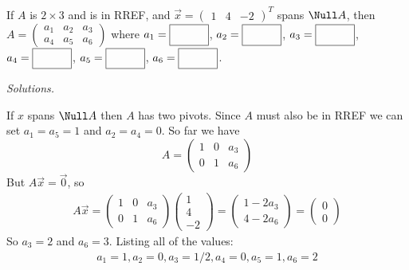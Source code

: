 \ifnum {}
    If $A$ is $2 \times 3$ and is in RREF, and $\vec x = \begin{pmatrix} 1&4&-2\end{pmatrix}^T$ spans $\Null A$, then $A=\begin{pmatrix} a_1 & a_2 & a_3 \\ a_4 & a_5 & a_6 \end{pmatrix} $ where 
    $a_1 = \framebox{\strut\hspace{1.0cm}}$, 
    $a_2 = \framebox{\strut\hspace{1.0cm}}$, 
    $a_3 = \framebox{\strut\hspace{1.0cm}}$, 
    $a_4 = \framebox{\strut\hspace{1.0cm}}$,
    $a_5 = \framebox{\strut\hspace{1.0cm}}$,
    $a_6 = \framebox{\strut\hspace{1.0cm}}$.

    \ifnum {} {\color{DarkBlue} \textit{Solutions.} 

    If $x$ spans $\Null A$ then $A$ has two pivots. Since $A$ must also be in RREF we can set $a_1=a_5=1$ and $a_2=a_4 = 0$. So far we have
    $$A = \begin{pmatrix} 1&0&a_3\\0&1&a_6\end{pmatrix}$$
    But $A\vec x = \vec 0$, so 
    \begin{align}
        A\vec x = \begin{pmatrix} 1&0&a_3\\0&1&a_6\end{pmatrix}\begin{pmatrix} 1\\4\\-2\end{pmatrix} = \begin{pmatrix} 1-2a_3 \\4-2a_6 \end{pmatrix} = \begin{pmatrix} 0\\0 \end{pmatrix}
    \end{align}
    So $a_3 = 2$ and $a_6 = 3$. Listing all of the values:
    \begin{align}
        a_1 = 1, a_2 = 0, a_3 = 1/2, a_4=0, a_5 = 1, a_6 = 2
    \end{align}
    } 
   \else
   \fi
\fi


